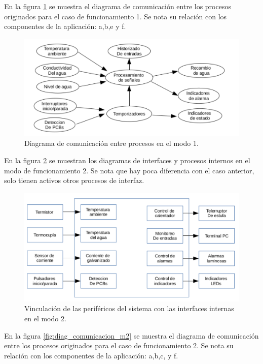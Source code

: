 En la figura \ref{fig:diag_comunicacion_m1} se muestra el diagrama de comunicación entre los procesos originados para el caso de funcionamiento 1. Se nota su relación con los componentes de la aplicación: a,b,e y f.

\begin{figure}[h!]
	\centering
	\includegraphics[width=1.0\textwidth]{Figures/Cap_3/diagrama_comunicacion_1}
	\caption{ Diagrama de comunicación entre procesos en el modo 1. }
	\label{fig:diag_comunicacion_m1}
\end{figure}
 
En la figura \ref{fig:diag_interfaces_m2} se muestran los diagramas de interfaces y procesos internos en el modo de funcionamiento 2.  Se nota que hay poca diferencia con el caso anterior, solo tienen activos otros procesos de interfaz.

\begin{figure}[h!]
	\centering
	\includegraphics[width=1.0\textwidth]{Figures/Cap_3/diagrama_interfaces_2}
	\caption{ Vinculación de las periféricos del sistema con las interfaces internas en el modo 2.}
	\label{fig:diag_interfaces_m2}
\end{figure}

En la figura \ref{fig:diag_comunicacion_m2} se muestra el diagrama de comunicación entre los procesos originados para el caso de funcionamiento 2. Se nota su relación con los componentes de la aplicación: a,b,c, y f.

